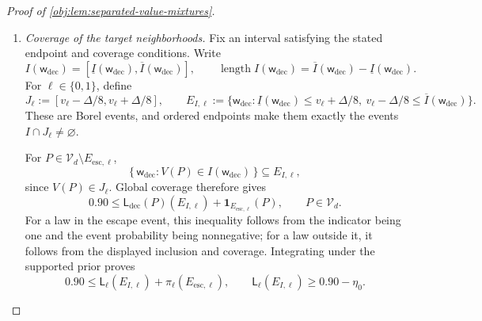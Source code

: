 \begin{proof}[Proof of \cref{obj:lem:separated-value-mixtures}]
\begin{enumerate}
Each supported prior average is bounded by the supremum on the causal class:
\[
\mathcal B_{\ell,T}
=
\int_{\mathcal V_d}\mathcal E_T(P)\,\pi_\ell(dP)
\le
\sup_{P\in\mathcal V_d}
\int
(T(\mathsf w_{\mathrm{dec}})-V(P))^2\,
\mathsf L_{\mathrm{dec}}(P)(d\mathsf w_{\mathrm{dec}}).
\]
If \(1-\omega-2\eta_0\ge0\), combining these inequalities gives the stated positive-part bound. If \(1-\omega-2\eta_0<0\), its positive part is zero and the bound follows from nonnegativity of squared risk. Finally, equality of the decision laws on \(\mathcal V_d\) identifies the supremum:
\[
\begin{aligned}
&\sup_{P\in\mathcal V_d}
\int
(T(\mathsf w_{\mathrm{dec}})-V(P))^2\,
\mathsf L_{\mathrm{dec}}(P)(d\mathsf w_{\mathrm{dec}})\\
&\qquad=
\sup_{P\in\mathcal V_d}
\mathbb E_{P,Q}\bigl[(T(\mathbf Z,R,U)-V(P))^2\bigr].
\end{aligned}
\]
This proves the risk assertion with its extended-nonnegative interpretation.

\item \textit{Coverage of the target neighborhoods.}
Fix an interval satisfying the stated endpoint and coverage conditions. Write
\[
I(\mathsf w_{\mathrm{dec}})
=
[\underline I(\mathsf w_{\mathrm{dec}}),
 \overline I(\mathsf w_{\mathrm{dec}})],
\qquad
\operatorname{length}I(\mathsf w_{\mathrm{dec}})
=
\overline I(\mathsf w_{\mathrm{dec}})
-\underline I(\mathsf w_{\mathrm{dec}}).
\]
For \(\ell\in\{0,1\}\), define
\[
J_\ell:=[v_\ell-\Delta/8,v_\ell+\Delta/8],
\qquad
E_{I,\ell}:=
\{\mathsf w_{\mathrm{dec}}:
\underline I(\mathsf w_{\mathrm{dec}})\le v_\ell+\Delta/8,\
v_\ell-\Delta/8\le\overline I(\mathsf w_{\mathrm{dec}})\}.
\]
These are Borel events, and ordered endpoints make them exactly the events
\(I\cap J_\ell\ne\varnothing\).

For \(P\in\mathcal V_d\setminus E_{\mathrm{esc},\ell}\),
\[
\{\,\mathsf w_{\mathrm{dec}}:
V(P)\in I(\mathsf w_{\mathrm{dec}})\,\}
\subseteq E_{I,\ell},
\]
since \(V(P)\in J_\ell\). Global coverage therefore gives
\[
0.90
\le
\mathsf L_{\mathrm{dec}}(P)(E_{I,\ell})
+\mathbf1_{E_{\mathrm{esc},\ell}}(P),
\qquad P\in\mathcal V_d.
\]
For a law in the escape event, this inequality follows from the indicator being one and the event probability being nonnegative; for a law outside it, it follows from the displayed inclusion and coverage. Integrating under the supported prior proves
\[
0.90
\le
\mathsf L_\ell(E_{I,\ell})
+\pi_\ell(E_{\mathrm{esc},\ell}),
\qquad
\mathsf L_\ell(E_{I,\ell})\ge0.90-\eta_0.
\]


\end{enumerate}
\end{proof}
